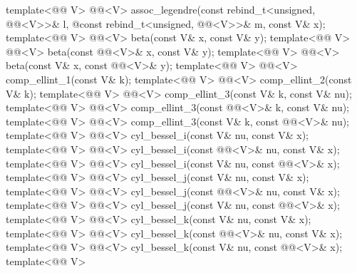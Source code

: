 \begin{codeblock}
{  template<@@ V>
    @@<V> assoc_legendre(const rebind_t<unsigned, @@<V>>& l,
                                   @\itcorr@ const rebind_t<unsigned, @@<V>>& m, const V& x);
  template<@@ V>
    @@<V> beta(const V& x, const V& y);
  template<@@ V>
    @@<V> beta(const @@<V>& x, const V& y);
  template<@@ V>
    @@<V> beta(const V& x, const @@<V>& y);
  template<@@ V> @@<V> comp_ellint_1(const V& k);
  template<@@ V> @@<V> comp_ellint_2(const V& k);
  template<@@ V>
    @@<V> comp_ellint_3(const V& k, const V& nu);
  template<@@ V>
    @@<V> comp_ellint_3(const @@<V>& k, const V& nu);
  template<@@ V>
    @@<V> comp_ellint_3(const V& k, const @@<V>& nu);
  template<@@ V>
    @@<V> cyl_bessel_i(const V& nu, const V& x);
  template<@@ V>
    @@<V> cyl_bessel_i(const @@<V>& nu, const V& x);
  template<@@ V>
    @@<V> cyl_bessel_i(const V& nu, const @@<V>& x);
  template<@@ V>
    @@<V> cyl_bessel_j(const V& nu, const V& x);
  template<@@ V>
    @@<V> cyl_bessel_j(const @@<V>& nu, const V& x);
  template<@@ V>
    @@<V> cyl_bessel_j(const V& nu, const @@<V>& x);
  template<@@ V>
    @@<V> cyl_bessel_k(const V& nu, const V& x);
  template<@@ V>
    @@<V> cyl_bessel_k(const @@<V>& nu, const V& x);
  template<@@ V>
    @@<V> cyl_bessel_k(const V& nu, const @@<V>& x);
  template<@@ V>
}
\end{codeblock}
